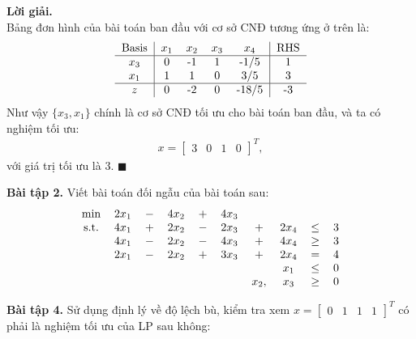 \documentclass[12pt]{article}
\newenvironment{solution}{%
     \setlength\parindent{0pt}\par\medskip\textbf{Lời giải.}\quad}{%
     \hfill\tiny$\blacksquare$\par\medskip}
\begin{document}
\begin{solution}
        \\
        Bảng đơn hình của bài toán ban đầu với cơ sở CNĐ tương ứng ở trên là:
        \begin{align*}
            \begin{tabular}{c|cccc|cc}
                \text{Basis} & $x_1$ & $x_2$ & $x_3$ & $x_4$ & RHS \\ \hline
                $x_3$ & 0 & -1 & 1 & -1/5 & 1 \\
                $x_1$ & 1 & 1 & 0 & 3/5 & 3 \\ \hline
                $z$ & 0 & -2 & 0 & -18/5 & -3 \\
            \end{tabular}
        \end{align*}
        Như vậy $\{x_3, x_1\}$ chính là cơ sở CNĐ tối ưu cho bài toán ban đầu, và ta có nghiệm tối ưu:
        \begin{align*}
            x = \begin{bmatrix}
                3 & 0 & 1 & 0
            \end{bmatrix}^T,
        \end{align*}
        với giá trị tối ưu là 3.
    \end{solution}
    \textbf{Bài tập 2.} Viết bài toán đối ngẫu của bài toán sau:
    \begin{align*}
        \begin{tabular}{cccccccccc}
            \text{min} & $2x_1$ & $-$ & $4x_2$ & $+$ & $4x_3$ \\
            \text{s.t.} & $4x_1$ & $+$ & $2x_2$ & $-$ & $2x_3$ & $+$ & $2x_4$ & $\leq$ & 3 \\
            & $4x_1$ & $-$ & $2x_2$ & $-$ & $4x_3$ & $+$ & $4x_4$ & $\geq$ & 3 \\
            & $2x_1$ & $-$ & $2x_2$ & $+$ & $3x_3$ & $+$ & $2x_4$ & $=$ & 4 \\
            & & & & & & & $x_1$ & $\leq$ & 0\\
            & & & & & & $x_2,$ & $x_3$ & $\geq$ & 0\\
        \end{tabular}
    \end{align*}
    
    
    \textbf{Bài tập 4.} Sử dụng định lý về độ lệch bù, kiểm tra xem $x = \begin{bmatrix} 0 & 1 & 1 & 1 \end{bmatrix}^T$ có phải là nghiệm tối ưu của LP sau không:
\end{document}
